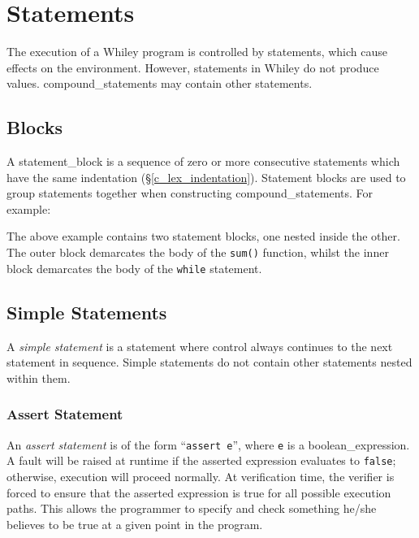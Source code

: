 \chapter{Statements}

The execution of a Whiley program is controlled by \gls{statement}s, which cause effects on the environment.  However, statements in Whiley do not produce values.  \Glspl{compound_statement} may contain other statements.

\section{Blocks}
\label{c_stmts_blocks}

A \gls{statement_block} is a sequence of zero or more consecutive statements which have the same indentation (\S\ref{c_lex_indentation}).  Statement blocks are used to group statements together when constructing \gls{compound_statement}s.  For example:



The above example contains two statement blocks, one nested inside the other.  The outer block demarcates the body of the \lstinline{sum()} function, whilst the inner block demarcates the body of the \lstinline{while} statement.


\section{Simple Statements}

A {\em simple statement} is a statement where control always continues to the next statement in sequence.  Simple statements do not contain other statements nested within them.


\subsection{Assert Statement}

An {\em assert statement} is of the form ``\lstinline{assert e}'', where \lstinline{e} is a \gls{boolean_expression}.  A \gls{fault} will be raised at runtime if the asserted expression evaluates to \lstinline{false}; otherwise, execution will proceed normally.  At verification time, the verifier is forced to ensure that the asserted expression is true for all possible execution paths.  This allows the programmer to specify and check something he/she believes to be true at a given point in the program.

